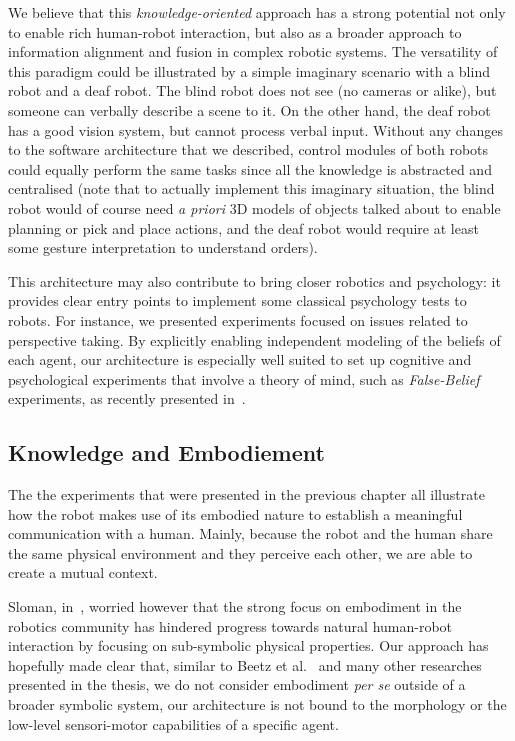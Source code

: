 We believe that this \emph{knowledge-oriented} approach has a strong potential
not only to enable rich human-robot interaction, but also as a broader approach
to information alignment and fusion in complex robotic systems.  The
versatility of this paradigm could be illustrated by a simple imaginary
scenario with a blind robot and a deaf robot. The blind robot does not see (no
cameras or alike), but someone can verbally describe a scene to it. On the
other hand, the deaf robot has a good vision system, but cannot process verbal
input.  Without any changes to the software architecture that we described,
control modules of both robots could equally perform the same tasks since all
the knowledge is abstracted and centralised (note that to actually implement
this imaginary situation, the blind robot would of course need \textit{a
priori} 3D models of objects talked about to enable planning or pick and place
actions, and the deaf robot would require at least some gesture interpretation
to understand orders).

This architecture may also contribute to bring closer robotics and psychology:
it provides clear entry points to implement some classical psychology tests to
robots. For instance, we presented experiments focused on issues related to
perspective taking. By explicitly enabling independent modeling of the beliefs
of each agent, our architecture is especially well suited to set up cognitive
and psychological experiments that involve a theory of mind, such as
\emph{False-Belief} experiments, as recently presented in~\cite{Warnier2012a}.


\subsection{Knowledge and Embodiement}

The the experiments that were presented in the previous chapter all illustrate how the
robot makes use of its embodied nature to establish a meaningful communication
with a human. Mainly, because the robot and the human share the same physical
environment and they perceive each other, we are able to create a mutual
context.

Sloman, in~\cite{Sloman2009}, worried however that the strong focus on
embodiment in the robotics community has hindered progress towards natural
human-robot interaction by focusing on sub-symbolic physical properties. Our
approach has hopefully made clear that, similar to Beetz et
al.~\cite{Beetz2010} and many other researches presented in the thesis, we do
not consider embodiment \emph{per se} outside of a broader symbolic system, \ie
our architecture is not bound to the morphology or the low-level sensori-motor
capabilities of a specific agent. 

